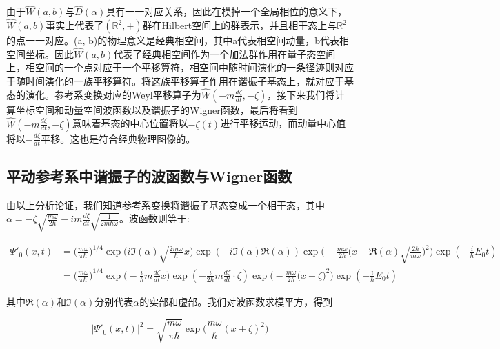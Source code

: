\documentclass[a4paper]{article}
\begin{document}
        由于$\hat{W}(a,b)$与$\hat{D}(\alpha)$具有一一对应关系，因此在模掉一个全局相位的意义下，$\hat{W}(a,b)$事实上代表了$(\mathbb{R}^2,+)$群在Hilbert空间上的群表示，并且相干态上与$\mathbb{R}^2$的点一一对应。(a, b)的物理意义是经典相空间，其中a代表相空间动量，b代表相空间坐标。因此$\hat{W}(a,b)$代表了经典相空间作为一个加法群作用在量子态空间上，相空间的一个点对应于一个平移算符，相空间中随时间演化的一条径迹则对应于随时间演化的一族平移算符。将这族平移算子作用在谐振子基态上，就对应于基态的演化。参考系变换对应的Weyl平移算子为$\hat{W}(-m\frac{d\zeta}{dt}, -\zeta)$，接下来我们将计算坐标空间和动量空间波函数以及谐振子的Wigner函数，最后将看到$\hat{W}(-m\frac{d\zeta}{dt}, -\zeta)$意味着基态的中心位置将以$-\zeta(t)$进行平移运动，而动量中心值将以$-\frac{d\zeta}{dt}$平移。这也是符合经典物理图像的。

    \subsection{平动参考系中谐振子的波函数与Wigner函数}

        由以上分析论证，我们知道参考系变换将谐振子基态变成一个相干态，其中$\alpha=-\zeta\sqrt{\frac{m\omega}{2\hbar}}-im\frac{d\zeta}{dt}\sqrt{\frac{1}{2m\hbar\omega}}$。波函数则等于:

        \begin{equation}
            \begin{split}   
                \Psi'_0(x,t) &= \bigg(\frac{m\omega}{\pi\hbar}\bigg)^{1/4} \exp\biggl(i\Im(\alpha)\sqrt{\frac{2m\omega}{\hbar}}x\biggr) \exp(-i\Im(\alpha)\Re(\alpha)) \exp\biggl(-\frac{m\omega}{2\hbar} \bigl(x-\Re(\alpha)\sqrt{\frac{2\hbar}{m\omega}}\bigr)^2 \biggr) \exp(-\frac{i}{\hbar}E_0 t) \\
                    &= \bigg(\frac{m\omega}{\pi\hbar}\bigg)^{1/4} \exp\biggl(-\frac{i}{\hbar}m\frac{d\zeta}{dt}x\biggr) \exp(-\frac{i}{2\hbar}m\frac{d\zeta}{dt}\cdot\zeta) \exp\biggl(-\frac{m\omega}{2\hbar} \bigl(x+\zeta\bigr)^2 \biggr) \exp(-\frac{i}{\hbar}E_0 t)
            \end{split}
        \end{equation}

        其中$\Re(\alpha)$和$\Im(\alpha)$分别代表$\alpha$的实部和虚部。我们对波函数求模平方，得到

        \begin{equation}
            |\Psi'_0(x,t)|^2 = \sqrt{\frac{m\omega}{\pi\hbar}}\exp\bigg(\frac{m\omega}{\hbar}(x+\zeta)^2\bigg)
        \end{equation}
\end{document}
